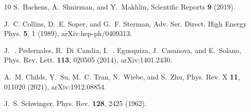 \documentclass[aps,prd,twocolumn,superscriptaddress,notitlepage,nofootinbib,preprintnumbers]{revtex4-1}
\begin{document}
\begin{thebibliography}{10}
S.~Backens, A.~Shnirman, and Y.~Makhlin,
\newblock Scientific Reports {\bf 9} (2019).

J.~C. Collins, D.~E. Soper, and G.~F. Sterman,
\newblock Adv. Ser. Direct. High Energy Phys. {\bf 5}, 1 (1989),
  arXiv:hep-ph/0409313.

J.~{\,}. Pedernales, R.~Di~Candia, I.~{\,}. Egusquiza, J.~Casanova, and
  E.~Solano,
\newblock Phys. Rev. Lett. {\bf 113}, 020505 (2014), arXiv:1401.2430.

A.~M. Childs, Y.~Su, M.~C. Tran, N.~Wiebe, and S.~Zhu,
\newblock Phys. Rev. X {\bf 11}, 011020 (2021), arXiv:1912.08854.

J.~S. Schwinger,
\newblock Phys. Rev. {\bf 128}, 2425 (1962).

\end{thebibliography}
\end{document}
